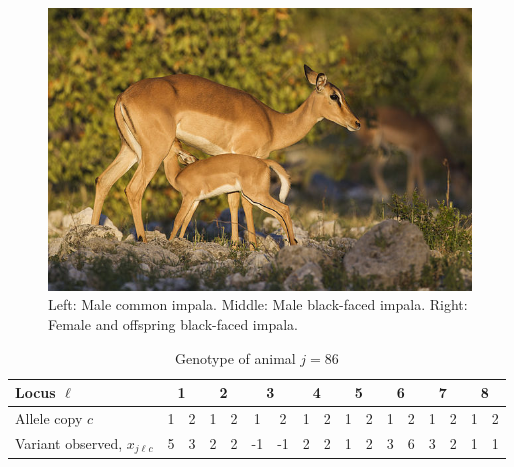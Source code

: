 \documentclass[12pt]{article}
\begin{document}
\begin{figure}
\begin{center}
\includegraphics[height=.2\textheight]{figures/female-impala.jpg}
\end{center}
\caption[]{Left: Male common impala. Middle: Male black-faced impala. Right: Female and offspring black-faced impala.\footnotemark}
\label{figure:impala}
\end{figure}



\begin{table}
\centering
\caption{Genotype of animal $j = 86$}%
\label{table:example}%
\begin{tabular}{|l|c|c|c|c|c|c|c|c|c|c|c|c|c|c|c|c|}%
\hline
Locus $\ell$ & 
\multicolumn{2}{|c|}{1} & 
\multicolumn{2}{|c|}{2} &
\multicolumn{2}{|c|}{3} & 
\multicolumn{2}{|c|}{4} &
\multicolumn{2}{|c|}{5} & 
\multicolumn{2}{|c|}{6} &
\multicolumn{2}{|c|}{7} & 
\multicolumn{2}{|c|}{8} \\
\hline
Allele copy $c$ & 1 & 2 & 1 & 2 & 1 & 2 & 1 & 2 & 1 & 2 & 1 & 2 & 1 & 2 & 1 & 2 \\
\hline
Variant observed, $x_{j \ell c}$ 
& 5 & 3  &  2 & 2  & -1 & -1  & 2 & 2 &  1 & 2 &  3 & 6  & 3 & 2  & 1 & 1\\   
\hline
\end{tabular}
\end{table}
\end{document}
